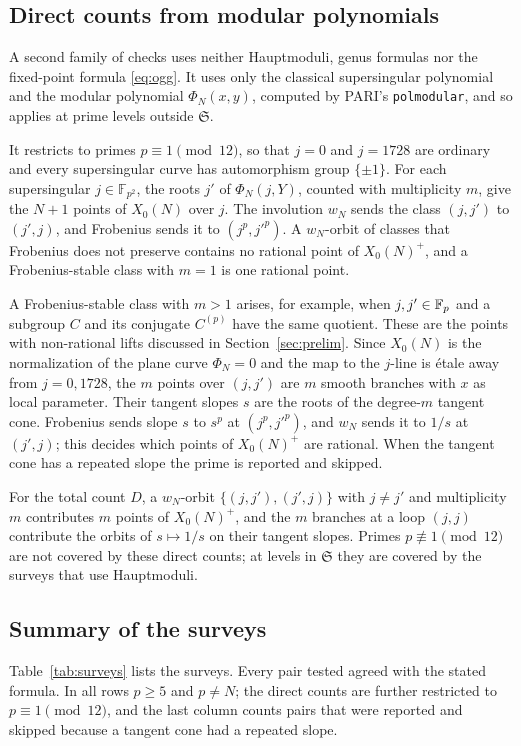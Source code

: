 \documentclass[11pt,a4paper]{article}
\theoremstyle{remark}\newtheorem{remark}[theorem]{Remark}
\numberwithin{equation}{section}
\begin{document}
\subsection{Direct counts from modular polynomials}\label{app:general}
A second family of checks uses neither Hauptmoduli, genus formulas nor the fixed-point formula \eqref{eq:ogg}. It uses only the classical supersingular polynomial and the modular polynomial $\Phi_N(x,y)$, computed by PARI's \texttt{polmodular}, and so applies at prime levels outside $\mathfrak S$.

It restricts to primes $p\equiv1\pmod{12}$, so that $j=0$ and $j=1728$ are ordinary and every supersingular curve has automorphism group $\{\pm1\}$. For each supersingular $j\in\mathbb F_{p^2}$, the roots $j'$ of $\Phi_N(j,Y)$, counted with multiplicity $m$, give the $N+1$ points of $X_0(N)$ over $j$. The involution $w_N$ sends the class $(j,j')$ to $(j',j)$, and Frobenius sends it to $(j^p,j'^p)$. A $w_N$-orbit of classes that Frobenius does not preserve contains no rational point of $X_0(N)^+$, and a Frobenius-stable class with $m=1$ is one rational point.

A Frobenius-stable class with $m>1$ arises, for example, when $j,j'\in\mathbb F_p$ and a subgroup $C$ and its conjugate $C^{(p)}$ have the same quotient. These are the points with non-rational lifts discussed in Section~\ref{sec:prelim}. Since $X_0(N)$ is the normalization of the plane curve $\Phi_N=0$ and the map to the $j$-line is \'etale away from $j=0,1728$, the $m$ points over $(j,j')$ are $m$ smooth branches with $x$ as local parameter. Their tangent slopes $s$ are the roots of the degree-$m$ tangent cone. Frobenius sends slope $s$ to $s^p$ at $(j^p,j'^p)$, and $w_N$ sends it to $1/s$ at $(j',j)$; this decides which points of $X_0(N)^+$ are rational. When the tangent cone has a repeated slope the prime is reported and skipped.

\label{app:degree}For the total count $D$, a $w_N$-orbit $\{(j,j'),(j',j)\}$ with $j\neq j'$ and multiplicity $m$ contributes $m$ points of $X_0(N)^+$, and the $m$ branches at a loop $(j,j)$ contribute the orbits of $s\mapsto1/s$ on their tangent slopes. Primes $p\not\equiv1\pmod{12}$ are not covered by these direct counts; at levels in $\mathfrak S$ they are covered by the surveys that use Hauptmoduli.

\subsection{Summary of the surveys}\label{app:resultant}
Table~\ref{tab:surveys} lists the surveys. Every pair tested agreed with the stated formula. In all rows $p\geq5$ and $p\neq N$; the direct counts are further restricted to $p\equiv1\pmod{12}$, and the last column counts pairs that were reported and skipped because a tangent cone had a repeated slope.
\end{document}
